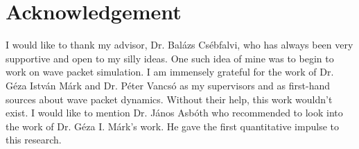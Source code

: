 \section{Acknowledgement}

I would like to thank my advisor, Dr. Balázs Csébfalvi, who has always been very supportive and open to my silly ideas. One such idea of mine was to begin to work on wave packet simulation.
I am immensely grateful for the work of Dr. Géza István Márk and Dr. Péter Vancsó as my supervisors and as first-hand sources about wave packet dynamics.
Without their help, this work wouldn't exist.
I would like to mention Dr. János Asbóth who recommended to look into the work of Dr. Géza I. Márk's work.
He gave the first quantitative impulse to this research.
